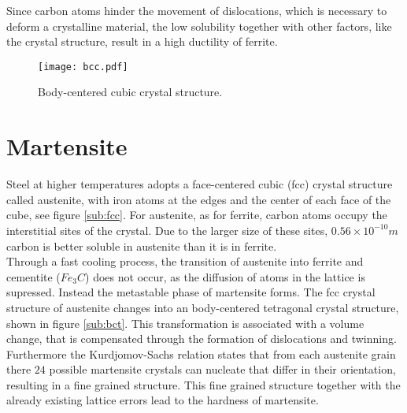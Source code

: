 Since carbon atoms hinder the movement of dislocations, which is necessary to deform a crystalline material, the low solubility together with other factors, like the crystal structure, result in a high ductility of ferrite. \\



\begin{figure}[H]
\centering
\texttt{[image: bcc.pdf]}
\caption{Body-centered cubic crystal structure.}
\label{fig:bcc}
\end{figure}

\section{Martensite}

Steel at higher temperatures adopts a face-centered cubic (fcc) crystal structure called austenite, with iron atoms at the edges and the center of each face of the cube, see figure \ref{sub:fcc}. For austenite, as for ferrite, carbon atoms occupy the interstitial sites of the crystal. Due to the larger size of these sites, $0.56\times 10^{-10} m$ carbon is better soluble in austenite than it is in ferrite. \\

Through a fast cooling process, the transition of austenite into ferrite and cementite ($Fe_3C$) does not occur, as the diffusion of atoms in the lattice is supressed. Instead the metastable phase of martensite forms. The fcc crystal structure of austenite changes into an body-centered tetragonal crystal structure, shown in figure \ref{sub:bct}. This transformation is associated with a volume change, that is compensated through the formation of dislocations and twinning. Furthermore the Kurdjomov-Sachs relation states that from each austenite grain there $24$ possible martensite crystals can nucleate that differ in their orientation, resulting in a fine grained structure. This fine grained structure together with the already existing lattice errors lead to the hardness of martensite.

